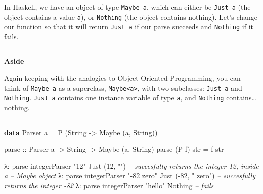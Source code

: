 \documentclass[]{article}
\newenvironment{Shaded}{}{}
\newcommand{\KeywordTok}[1]{\textcolor[rgb]{0.00,0.44,0.13}{\textbf{{#1}}}}
\newcommand{\DataTypeTok}[1]{\textcolor[rgb]{0.56,0.13,0.00}{{#1}}}
\newcommand{\DecValTok}[1]{\textcolor[rgb]{0.25,0.63,0.44}{{#1}}}
\newcommand{\StringTok}[1]{\textcolor[rgb]{0.25,0.44,0.63}{{#1}}}
\newcommand{\CommentTok}[1]{\textcolor[rgb]{0.38,0.63,0.69}{\textit{{#1}}}}
\newcommand{\OtherTok}[1]{\textcolor[rgb]{0.00,0.44,0.13}{{#1}}}
\newcommand{\FunctionTok}[1]{\textcolor[rgb]{0.02,0.16,0.49}{{#1}}}
\newcommand{\NormalTok}[1]{{#1}}
\begin{document}
In Haskell, we have an object of type \texttt{Maybe\ a}, which can
either be \texttt{Just\ a} (the object contains a value \texttt{a}), or
\texttt{Nothing} (the object contains nothing). Let's change our
function so that it will return \texttt{Just\ a} if our parse succeeds
and \texttt{Nothing} if it fails.

\begin{center}\rule{0.5\linewidth}{\linethickness}\end{center}

\textbf{Aside}

Again keeping with the analogies to Object-Oriented Programming, you can
think of \texttt{Maybe\ a} as a superclass,
\texttt{Maybe\textless{}a\textgreater{}}, with two subclasses:
\texttt{Just\ a} and \texttt{Nothing}. \texttt{Just\ a} contains one
instance variable of type \texttt{a}, and \texttt{Nothing}
contains\ldots{}nothing.

\begin{center}\rule{0.5\linewidth}{\linethickness}\end{center}

\begin{Shaded}
\begin{Highlighting}[]
\KeywordTok{data} \DataTypeTok{Parser} \NormalTok{a }\FunctionTok{=} \DataTypeTok{P} \NormalTok{(}\DataTypeTok{String} \OtherTok{->} \DataTypeTok{Maybe} \NormalTok{(a, }\DataTypeTok{String}\NormalTok{))}

\OtherTok{parse ::} \DataTypeTok{Parser} \NormalTok{a }\OtherTok{->} \DataTypeTok{String} \OtherTok{->} \DataTypeTok{Maybe} \NormalTok{(a, }\DataTypeTok{String}\NormalTok{)}
\NormalTok{parse (}\DataTypeTok{P} \NormalTok{f) str }\FunctionTok{=} \NormalTok{f str}
\end{Highlighting}
\end{Shaded}

\begin{Shaded}
\begin{Highlighting}[]
\NormalTok{λ}\FunctionTok{:} \NormalTok{parse integerParser }\StringTok{"12"}
\DataTypeTok{Just} \NormalTok{(}\DecValTok{12}\NormalTok{, }\StringTok{""}\NormalTok{)               }\CommentTok{-- succesfully returns the integer 12, inside a}
                            \CommentTok{-- Maybe object}
\NormalTok{λ}\FunctionTok{:} \NormalTok{parse integerParser }\StringTok{"-82 zero"}
\DataTypeTok{Just} \NormalTok{(}\FunctionTok{-}\DecValTok{82}\NormalTok{, }\StringTok{" zero"}\NormalTok{)         }\CommentTok{-- succesfully returns the integer -82}
\NormalTok{λ}\FunctionTok{:} \NormalTok{parse integerParser }\StringTok{"hello"}
\DataTypeTok{Nothing}                     \CommentTok{-- fails}
\end{Highlighting}
\end{Shaded}
\end{document}
